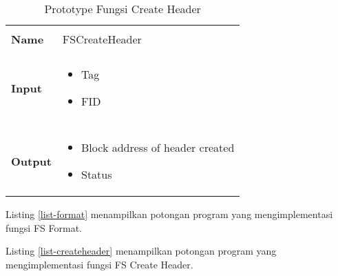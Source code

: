 \begin{table}[hp]
  \centering
  \begin{tabular}{p{2cm} p{8cm}}
    \hline\\
    {\bf Name} & FSCreateHeader\\
    \hline\\
    {\bf Input} &
    \begin{itemize}[noitemsep,topsep=0pt,parsep=0pt,partopsep=0pt]
    \item Tag
    \item FID
    \end{itemize}
    \\
    \hline\\
    {\bf Output} & 
    \begin{itemize}[noitemsep,topsep=0pt,parsep=0pt,partopsep=0pt]
    \item Block address of header created
    \item Status
    \end{itemize}
    \\
    \hline
  \end{tabular}
  \caption{Prototype Fungsi Create Header}
  \label{tabel-createheader}
\end{table}

Listing \ref{list-format} menampilkan potongan program yang mengimplementasi fungsi FS Format.

Listing \ref{list-createheader} menampilkan potongan program yang mengimplementasi fungsi FS Create Header.

